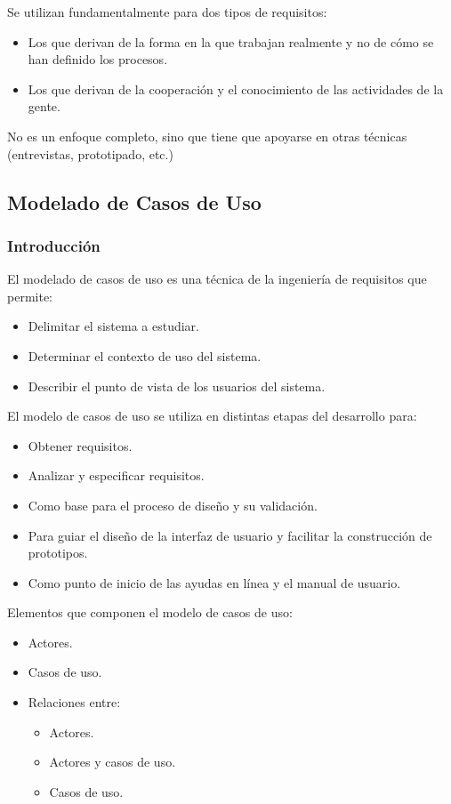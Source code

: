 \documentclass[12pt,spanish]{article}
\begin{document}
Se utilizan fundamentalmente para dos tipos de requisitos:
\begin{itemize}
	\item Los que derivan de la forma en la que trabajan realmente y no de cómo se han definido los procesos.
	\item Los que derivan de la cooperación y el conocimiento de las actividades de la gente.
\end{itemize}

No es un enfoque completo, sino que tiene que apoyarse en otras técnicas (entrevistas, prototipado, etc.)

\subsection{Modelado de Casos de Uso}

\subsubsection{Introducción}

El modelado de casos de uso es una técnica de la ingeniería de requisitos que permite:
\begin{itemize}
	\item Delimitar el sistema a estudiar.
	\item Determinar el contexto de uso del sistema.
	\item Describir el punto de vista de los usuarios del sistema.
\end{itemize}

El modelo de casos de uso se utiliza en distintas etapas del desarrollo para:
\begin{itemize}
	\item Obtener requisitos.
	\item Analizar y especificar requisitos.
	\item Como base para el proceso de diseño y su validación.
	\item Para guiar el diseño de la interfaz de usuario y facilitar la construcción de prototipos.
	\item Como punto de inicio de las ayudas en línea y el manual de usuario.
\end{itemize}

Elementos que componen el modelo de casos de uso:
\begin{itemize}
	\item Actores.
	\item Casos de uso.
	\item Relaciones entre:
		\begin{itemize}
			\item Actores.
			\item Actores y casos de uso.
			\item Casos de uso.
		\end{itemize}
\end{itemize}
\end{document}
